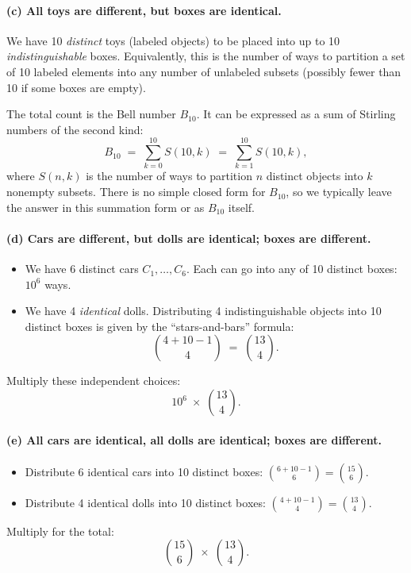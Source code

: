 \documentclass[docmute]{article}
\begin{document}
\paragraph{(c) All toys are different, but boxes are identical.}
We have 10 \emph{distinct} toys (labeled objects) to be placed into up to 10 \emph{indistinguishable} boxes. Equivalently, this is the number of ways to partition a set of 10 labeled elements into any number of unlabeled subsets (possibly fewer than 10 if some boxes are empty).

The total count is the Bell number \(B_{10}\). It can be expressed as a sum of Stirling numbers of the second kind:
\[
B_{10}
\;=\;
\sum_{k=0}^{10} S(10,k)
\;=\;
\sum_{k=1}^{10} S(10,k),
\]
where \(S(n,k)\) is the number of ways to partition \(n\) distinct objects into \(k\) nonempty subsets. There is no simple closed form for \(B_{10}\), so we typically leave the answer in this summation form or as \(B_{10}\) itself.

\paragraph{(d) Cars are different, but dolls are identical; boxes are different.}
\begin{itemize}[nosep]
  \item We have 6 distinct cars \(C_1,\ldots,C_6\). Each can go into any of 10 distinct boxes: \(10^6\) ways.
  \item We have 4 \emph{identical} dolls. Distributing 4 indistinguishable objects into 10 distinct boxes is given by the ``stars-and-bars'' formula:
  \[
  \binom{4 + 10 - 1}{4} \;=\;\binom{13}{4}.
  \]
\end{itemize}
Multiply these independent choices:
\[
10^6 \;\times\; \binom{13}{4}.
\]

\paragraph{(e) All cars are identical, all dolls are identical; boxes are different.}
\begin{itemize}[nosep]
  \item Distribute 6 identical cars into 10 distinct boxes: \(\displaystyle \binom{6 + 10 - 1}{6} = \binom{15}{6}.\)
  \item Distribute 4 identical dolls into 10 distinct boxes: \(\displaystyle \binom{4 + 10 - 1}{4} = \binom{13}{4}.\)
\end{itemize}
Multiply for the total:
\[
\binom{15}{6} \;\times\; \binom{13}{4}.
\]
\end{document}
